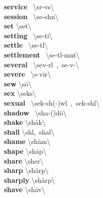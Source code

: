 \documentclass[10pt,a4paper]{article}
\begin{document}
\begin{multicols}{2}
\textbf{ service }\quad \ \textbackslash \textprimstress s\textschwa r-v\textschwa s\textbackslash \\
\textbf{ session }\quad \ \textbackslash \textprimstress se-sh\textschwa n\textbackslash \\
\textbf{ set }\quad \textbackslash \textprimstress set\textbackslash \\
\textbf{ setting }\quad \ \textbackslash \textprimstress se-ti\engma \textbackslash \\
\textbf{ settle }\quad \ \textbackslash \textprimstress se-t\textsuperscript{\textreve}l\textbackslash \\
\textbf{ settlement }\quad \ \textbackslash \textprimstress se-t\textsuperscript{\textreve}l-m\textschwa nt\textbackslash \\
\textbf{ several }\quad \ \textbackslash \textprimstress sev-r\textschwa l\ ,\ \textprimstress se-v\textschwa -\textbackslash \\
\textbf{ severe }\quad \ \textbackslash s\textschwa -\textprimstress vir\textbackslash \\
\textbf{ sew }\quad \textbackslash \textprimstress s\={o}\textbackslash \\
\textbf{ sex }\quad \textbackslash \textprimstress seks\textbackslash \\
\textbf{ sexual }\quad \ \textbackslash \textprimstress sek-sh(\textschwa -)w\textschwa l\ ,\ \textprimstress sek-sh\textschwa l\textbackslash \\
\textbf{ shadow }\quad \ \textbackslash \textprimstress sha-(\textsecstress )d\={o}\textbackslash \\
\textbf{ shake }\quad \textbackslash \textprimstress sh\={a}k\textbackslash \\
\textbf{ shall }\quad \textbackslash sh\textschwa l,\ \textprimstress shal\textbackslash \\
\textbf{ shame }\quad \textbackslash \textprimstress sh\={a}m\textbackslash \\
\textbf{ shape }\quad \textbackslash \textprimstress sh\={a}p\textbackslash \\
\textbf{ share }\quad \textbackslash \textprimstress sher\textbackslash \\
\textbf{ sharp }\quad \textbackslash \textprimstress sh\"{a}rp\textbackslash \\
\textbf{ sharply }\quad \textbackslash \textprimstress sh\"{a}rp\textbackslash \\
\textbf{ shave }\quad \textbackslash \textprimstress sh\={a}v\textbackslash \\

\end{multicols}
\end{document}

